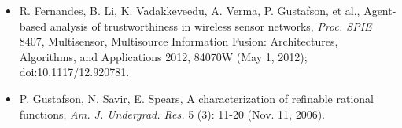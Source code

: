 \begin{itemize}
  \item[] R. Fernandes, B. Li, K. Vadakkeveedu, A. Verma, P. Gustafson, et al., {Agent-based analysis of trustworthiness in wireless sensor networks}, \emph{Proc. SPIE} {8407}, Multisensor, Multisource Information Fusion: Architectures, Algorithms, and Applications 2012, 84070W (May 1, 2012); doi:10.1117/12.920781. 

 \item[] P. Gustafson, N. Savir, E. Spears, {A characterization of refinable rational functions}, \emph{Am. J. Undergrad. Res.} {5} (3): 11-20 (Nov. 11, 2006).
  
 \end{itemize}
 
